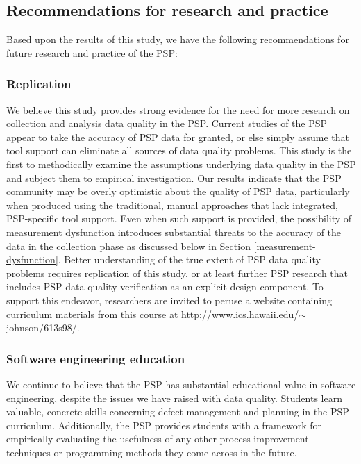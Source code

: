 \subsection{Recommendations for research and practice}

Based upon the results of this study, we have the following recommendations 
for future research and practice of the PSP:


\subsubsection{Replication} 

We believe this study provides strong evidence for the need for more
research on collection and analysis data quality in the PSP.  Current
studies of the PSP appear to take the accuracy of PSP data for granted, or 
else simply assume that tool support can eliminate all sources of 
data quality problems. 
This study is the first to methodically examine the assumptions underlying
data quality in the PSP and subject them to empirical investigation. Our
results indicate that the PSP community may be overly optimistic about the
quality of PSP data, particularly when produced using the traditional, manual
approaches that lack integrated, PSP-specific tool support. Even when such
support is provided, the possibility of measurement dysfunction introduces
substantial threats to the accuracy of the data in the collection phase
as discussed below in Section \ref{measurement-dysfunction}.  Better
understanding of the true extent of PSP data quality problems requires
replication of this study, or at least further PSP research that includes
PSP data quality verification as an explicit design component.  To 
support this endeavor, researchers are invited to peruse a website
containing curriculum materials from this course at
http://www.ics.hawaii.edu/$\sim$johnson/613s98/.  



\subsubsection{Software engineering education}

We continue to believe that the PSP has substantial educational value in
software engineering, despite the issues we have raised with data quality.
Students learn valuable, concrete skills concerning defect management and
planning in the PSP curriculum.  Additionally, the PSP provides students
with a framework for empirically evaluating the usefulness of any other
process improvement techniques or programming methods they come across in
the future.  


